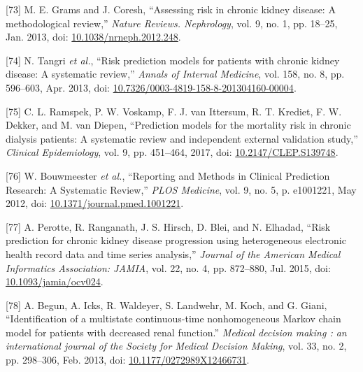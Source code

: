 \documentclass[12pt,PhD,twoside,openright]{muthesis}
\newenvironment{cslreferences}%
  {}%
  {\par}
\begin{document}
\begin{cslreferences}
\leavevmode\hypertarget{ref-grams_assessing_2013}{}%
{[}73{]} M. E. Grams and J. Coresh, ``Assessing risk in chronic kidney disease: A methodological review,'' \emph{Nature Reviews. Nephrology}, vol. 9, no. 1, pp. 18--25, Jan. 2013, doi: \href{https://doi.org/10.1038/nrneph.2012.248}{10.1038/nrneph.2012.248}.

\leavevmode\hypertarget{ref-tangri_risk_2013}{}%
{[}74{]} N. Tangri \emph{et al.}, ``Risk prediction models for patients with chronic kidney disease: A systematic review,'' \emph{Annals of Internal Medicine}, vol. 158, no. 8, pp. 596--603, Apr. 2013, doi: \href{https://doi.org/10.7326/0003-4819-158-8-201304160-00004}{10.7326/0003-4819-158-8-201304160-00004}.

\leavevmode\hypertarget{ref-ramspek_prediction_2017}{}%
{[}75{]} C. L. Ramspek, P. W. Voskamp, F. J. van Ittersum, R. T. Krediet, F. W. Dekker, and M. van Diepen, ``Prediction models for the mortality risk in chronic dialysis patients: A systematic review and independent external validation study,'' \emph{Clinical Epidemiology}, vol. 9, pp. 451--464, 2017, doi: \href{https://doi.org/10.2147/CLEP.S139748}{10.2147/CLEP.S139748}.

\leavevmode\hypertarget{ref-bouwmeester_reporting_2012-1}{}%
{[}76{]} W. Bouwmeester \emph{et al.}, ``Reporting and Methods in Clinical Prediction Research: A Systematic Review,'' \emph{PLOS Medicine}, vol. 9, no. 5, p. e1001221, May 2012, doi: \href{https://doi.org/10.1371/journal.pmed.1001221}{10.1371/journal.pmed.1001221}.

\leavevmode\hypertarget{ref-perotte_risk_2015}{}%
{[}77{]} A. Perotte, R. Ranganath, J. S. Hirsch, D. Blei, and N. Elhadad, ``Risk prediction for chronic kidney disease progression using heterogeneous electronic health record data and time series analysis,'' \emph{Journal of the American Medical Informatics Association: JAMIA}, vol. 22, no. 4, pp. 872--880, Jul. 2015, doi: \href{https://doi.org/10.1093/jamia/ocv024}{10.1093/jamia/ocv024}.

\leavevmode\hypertarget{ref-begun_identification_2013}{}%
{[}78{]} A. Begun, A. Icks, R. Waldeyer, S. Landwehr, M. Koch, and G. Giani, ``Identification of a multistate continuous-time nonhomogeneous Markov chain model for patients with decreased renal function.'' \emph{Medical decision making : an international journal of the Society for Medical Decision Making}, vol. 33, no. 2, pp. 298--306, Feb. 2013, doi: \href{https://doi.org/10.1177/0272989X12466731}{10.1177/0272989X12466731}.


\end{cslreferences}
\end{document}

